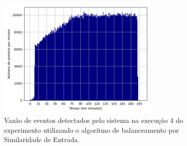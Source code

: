 


\begin{figure}[h]
\centering
\includegraphics[width=0.7\textwidth]{figuras/graphics/histogram_vazao_9-dez-is.png}
\caption{Vazão de eventos detectados pelo sistema na execução 4 do experimento utilizando o algoritmo de balanceamento por Similaridade de Entrada.}
\label{fig:vazao_9-dez-is}
\end{figure}



